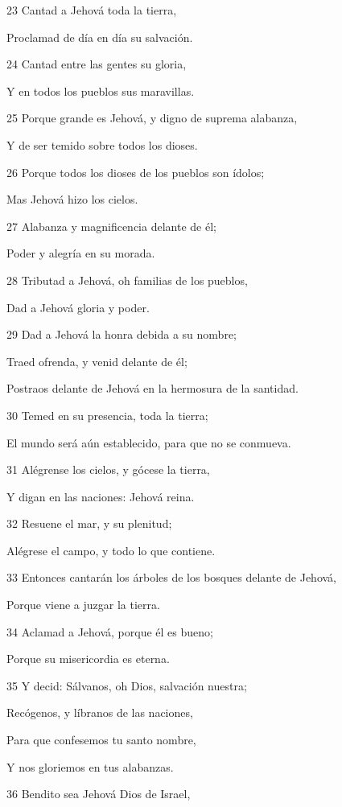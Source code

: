 \par 23 Cantad a Jehová toda la tierra, 
\par Proclamad de día en día su salvación.
\par 24 Cantad entre las gentes su gloria,
\par Y en todos los pueblos sus maravillas.
\par 25 Porque grande es Jehová, y digno de suprema alabanza,
\par Y de ser temido sobre todos los dioses.
\par 26 Porque todos los dioses de los pueblos son ídolos;
\par Mas Jehová hizo los cielos.
\par 27 Alabanza y magnificencia delante de él;
\par Poder y alegría en su morada.
\par 28 Tributad a Jehová, oh familias de los pueblos,
\par Dad a Jehová gloria y poder. 
\par 29 Dad a Jehová la honra debida a su nombre;
\par Traed ofrenda, y venid delante de él;
\par Postraos delante de Jehová en la hermosura de la santidad. 
\par 30 Temed en su presencia, toda la tierra;
\par El mundo será aún establecido, para que no se conmueva. 
\par 31 Alégrense los cielos, y gócese la tierra,
\par Y digan en las naciones: Jehová reina.
\par 32 Resuene el mar, y su plenitud;
\par Alégrese el campo, y todo lo que contiene.
\par 33 Entonces cantarán los árboles de los bosques delante de Jehová,
\par Porque viene a juzgar la tierra.
\par 34 Aclamad a Jehová, porque él es bueno;
\par Porque su misericordia es eterna. 
\par 35 Y decid: Sálvanos, oh Dios, salvación nuestra;
\par Recógenos, y líbranos de las naciones,
\par Para que confesemos tu santo nombre,
\par Y nos gloriemos en tus alabanzas.
\par 36 Bendito sea Jehová Dios de Israel,
